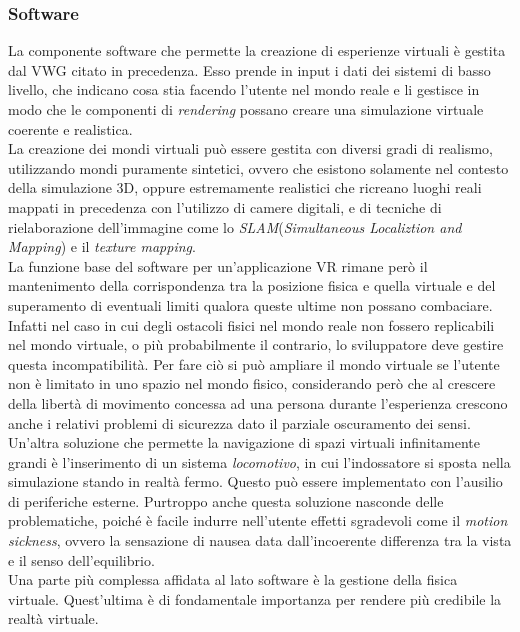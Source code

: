 \subsubsection{Software}
La componente software che permette la creazione di esperienze virtuali è gestita dal VWG citato in precedenza. Esso prende in input i dati dei sistemi di basso livello, che indicano cosa stia facendo l'utente nel mondo reale e li gestisce in modo che le componenti di \textit{rendering} possano creare una simulazione virtuale coerente e realistica.\\ La creazione dei mondi virtuali può essere gestita con diversi gradi di realismo, utilizzando mondi puramente sintetici, ovvero che esistono solamente nel contesto della simulazione 3D, oppure estremamente realistici che ricreano luoghi reali mappati in precedenza con l'utilizzo di camere digitali, e di tecniche di rielaborazione dell'immagine come lo \textit{SLAM}(\textit{Simultaneous Localiztion and Mapping}) e il \textit{texture mapping}. \\
\newline
La funzione base del software per un'applicazione VR rimane però il mantenimento della corrispondenza tra la posizione fisica e quella virtuale e del superamento di eventuali limiti qualora queste ultime non possano combaciare. Infatti nel caso in cui degli  ostacoli fisici nel mondo reale non fossero replicabili nel mondo virtuale, o più probabilmente il contrario, lo sviluppatore deve gestire questa incompatibilità. Per fare ciò si può ampliare il mondo virtuale se l'utente non è limitato in uno spazio nel mondo fisico, considerando però che al crescere della libertà di movimento concessa ad una persona durante l'esperienza crescono anche i relativi problemi di sicurezza dato il parziale oscuramento dei sensi. Un'altra soluzione che permette la navigazione di spazi virtuali infinitamente grandi è l'inserimento di un sistema \textit{locomotivo}, in cui l'indossatore si sposta nella simulazione stando in realtà fermo. Questo può essere implementato con l'ausilio di periferiche esterne. Purtroppo anche questa soluzione nasconde delle problematiche, poiché è facile indurre nell'utente effetti sgradevoli come il \textit{motion sickness}, ovvero la sensazione di nausea data dall'incoerente differenza tra la vista e il senso dell'equilibrio.\\
Una parte più complessa affidata al lato software è la gestione della fisica virtuale. Quest'ultima è di fondamentale importanza per rendere più credibile la realtà virtuale.\\
